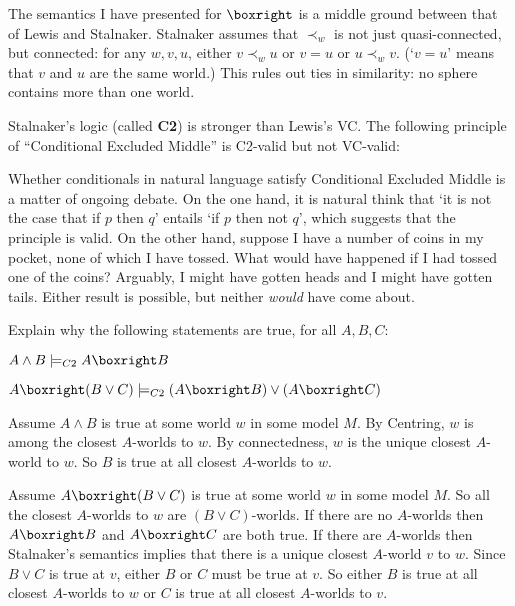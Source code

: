 
The semantics I have presented for $\boxright$ is a middle ground between that
of Lewis and Stalnaker. Stalnaker assumes that $\prec_w$ is not just
quasi-connected, but connected: for any $w,v,u$, either $v \prec_w u$ or $v=u$
or $u \prec_w v$. (`$v=u$' means that $v$ and $u$ are the same world.) This
rules out ties in similarity: no sphere contains more than one world.

Stalnaker's logic (called \textbf{C2}) is stronger than Lewis's VC. The
following principle of ``Conditional Excluded Middle'' is C2-valid but not VC-valid:
%


Whether conditionals in natural language satisfy Conditional Excluded Middle is
a matter of ongoing debate. On the one hand, it is natural think that `it is not
the case that if $p$ then $q$' entails `if $p$ then not $q$', which suggests
that the principle is valid. On the other hand, suppose I have a number of coins
in my pocket, none of which I have tossed. What would have happened if I had
tossed one of the coins? Arguably, I might have gotten heads and I might have
gotten tails. Either result is possible, but neither \emph{would} have come
about.

\begin{exercise}
  Explain why the following statements are true, for all $A,B,C$:
  \begin{exlist}
  \item $A \land B \models_{C2} A \boxright B$
  \item $A \boxright (B\lor C) \models_{C2} (A \boxright B) \lor (A \boxright C)$
  \end{exlist}
\end{exercise}
\begin{solution}
  \begin{sollist}
    \item Assume $A\land B$ is true at some world $w$ in some model $M$. By
    Centring, $w$ is among the closest $A$-worlds to $w$. By connectedness, $w$
    is the unique closest $A$-world to $w$. So $B$ is true at all closest
    $A$-worlds to $w$.
    \item Assume $A \boxright (B\lor C)$ is true at some world $w$ in some model
    $M$. So all the closest $A$-worlds to $w$ are $(B\lor C)$-worlds. If there
    are no $A$-worlds then $A \boxright B$ and $A \boxright C$ are both true. If
    there are $A$-worlds then Stalnaker's semantics implies that there is a
    unique closest $A$-world $v$ to $w$. Since $B\lor C$ is true at $v$, either $B$ or $C$ must be true at $v$. So either $B$ is true at all closest $A$-worlds to $w$ or $C$ is true at all closest $A$-worlds to $v$.
  \end{sollist}
\end{solution}

